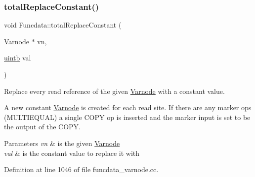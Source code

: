\subsubsection{\texorpdfstring{totalReplaceConstant()}{totalReplaceConstant()}}
{\footnotesize\ttfamily void Funcdata\+::total\+Replace\+Constant (\begin{DoxyParamCaption}\item[{\mbox{\hyperlink{class_varnode}{Varnode}} $\ast$}]{vn,  }\item[{\mbox{\hyperlink{types_8h_a2db313c5d32a12b01d26ac9b3bca178f}{uintb}}}]{val }\end{DoxyParamCaption})}



Replace every read reference of the given \mbox{\hyperlink{class_varnode}{Varnode}} with a constant value. 

A new constant \mbox{\hyperlink{class_varnode}{Varnode}} is created for each read site. If there are any marker ops (M\+U\+L\+T\+I\+E\+Q\+U\+AL) a single C\+O\+PY op is inserted and the marker input is set to be the output of the C\+O\+PY. 
\begin{DoxyParams}{Parameters}
{\em vn} & is the given \mbox{\hyperlink{class_varnode}{Varnode}} \\
\hline
{\em val} & is the constant value to replace it with \\
\hline
\end{DoxyParams}


Definition at line 1046 of file funcdata\+\_\+varnode.\+cc.

